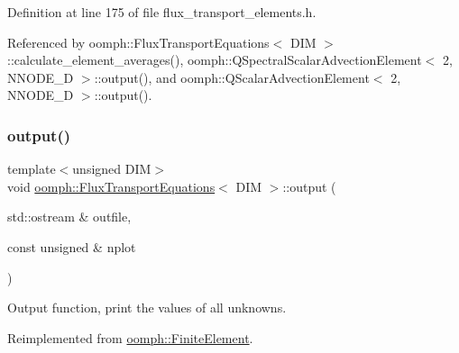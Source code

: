 Definition at line 175 of file flux\+\_\+transport\+\_\+elements.\+h.



Referenced by oomph\+::\+Flux\+Transport\+Equations$<$ D\+I\+M $>$\+::calculate\+\_\+element\+\_\+averages(), oomph\+::\+Q\+Spectral\+Scalar\+Advection\+Element$<$ 2, N\+N\+O\+D\+E\+\_\+D $>$\+::output(), and oomph\+::\+Q\+Scalar\+Advection\+Element$<$ 2, N\+N\+O\+D\+E\+\_\+D $>$\+::output().

\mbox{\label{classoomph_1_1FluxTransportEquations_a6b9ea1eb9feb8c71c1d935c52e7d896f}} 
\subsubsection{\texorpdfstring{output()}{output()}\hspace{0.1cm}{\footnotesize\ttfamily [2/2]}}
{\footnotesize\ttfamily template$<$unsigned D\+IM$>$ \\
void \hyperlink{classoomph_1_1FluxTransportEquations}{oomph\+::\+Flux\+Transport\+Equations}$<$ D\+IM $>$\+::output (\begin{DoxyParamCaption}\item[{std\+::ostream \&}]{outfile,  }\item[{const unsigned \&}]{nplot }\end{DoxyParamCaption})\hspace{0.3cm}{\ttfamily [virtual]}}



Output function, print the values of all unknowns. 



Reimplemented from \hyperlink{classoomph_1_1FiniteElement_afa9d9b2670f999b43e6679c9dd28c457}{oomph\+::\+Finite\+Element}.



